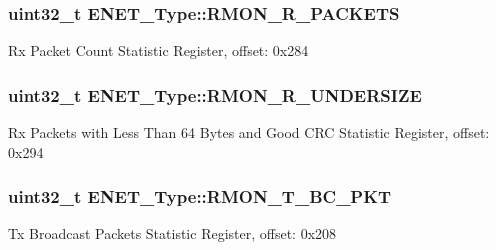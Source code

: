 \subsubsection[{\texorpdfstring{R\+M\+O\+N\+\_\+\+R\+\_\+\+P\+A\+C\+K\+E\+TS}{RMON_R_PACKETS}}]{ uint32\+\_\+t E\+N\+E\+T\+\_\+\+Type\+::\+R\+M\+O\+N\+\_\+\+R\+\_\+\+P\+A\+C\+K\+E\+TS}\hypertarget{structENET__Type_add3ce80ae1d16b160ca9ff190372f05b}{}\label{structENET__Type_add3ce80ae1d16b160ca9ff190372f05b}
Rx Packet Count Statistic Register, offset\+: 0x284 
\subsubsection[{\texorpdfstring{R\+M\+O\+N\+\_\+\+R\+\_\+\+U\+N\+D\+E\+R\+S\+I\+ZE}{RMON_R_UNDERSIZE}}]{ uint32\+\_\+t E\+N\+E\+T\+\_\+\+Type\+::\+R\+M\+O\+N\+\_\+\+R\+\_\+\+U\+N\+D\+E\+R\+S\+I\+ZE}\hypertarget{structENET__Type_ad7e0f00fad0ca59e3ea781d0ec0e3a30}{}\label{structENET__Type_ad7e0f00fad0ca59e3ea781d0ec0e3a30}
Rx Packets with Less Than 64 Bytes and Good C\+RC Statistic Register, offset\+: 0x294 
\subsubsection[{\texorpdfstring{R\+M\+O\+N\+\_\+\+T\+\_\+\+B\+C\+\_\+\+P\+KT}{RMON_T_BC_PKT}}]{ uint32\+\_\+t E\+N\+E\+T\+\_\+\+Type\+::\+R\+M\+O\+N\+\_\+\+T\+\_\+\+B\+C\+\_\+\+P\+KT}\hypertarget{structENET__Type_a67f008396a91b3162956b24f9ae72099}{}\label{structENET__Type_a67f008396a91b3162956b24f9ae72099}
Tx Broadcast Packets Statistic Register, offset\+: 0x208 
